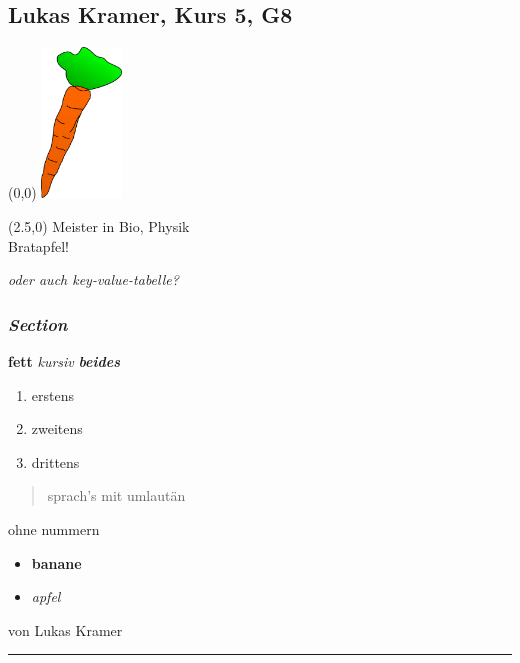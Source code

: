 \subsection*{Lukas Kramer, Kurs 5, G8}
\begin{textblock}{2.5}(0,0)
	\noindent\mbox{\includegraphics[height=4cm ]{karotte2.png}} %
\end{textblock}

\begin{textblock}{10}(2.5,0)
	\setlength{\parindent}{0cm}
	Meister in Bio, Physik \\
	Bratapfel!
	
	{\em oder auch key-value-tabelle?}
\end{textblock}

\vspace{4.5cm}
\subsubsection*{\emph{Section}}

\textbf{fett} \emph{kursiv} \textbf{\emph{beides}}

\begin{enumerate}
\item
  erstens
\item
  zweitens
\item
  drittens
\end{enumerate}
\begin{quote}
sprach's mit umlautän

\end{quote}
ohne nummern

\begin{itemize}
\item
  \textbf{banane}
\item
  \emph{apfel}
\end{itemize}


\vspace{3mm}
von Lukas Kramer
\vfill
\hrule
\vspace{2mm}
{\small

}

\newpage
